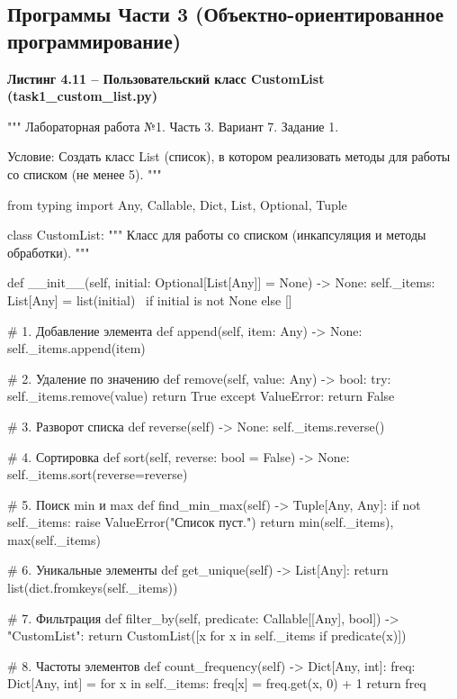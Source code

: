 \documentclass[14pt,a4paper]{extarticle}
\newcommand{\listingtitle}[1]{%
  \par\vspace{8pt}%
  \noindent\hspace*{1.25cm}\textbf{#1}\par\vspace{2pt}%
}
\begin{document}
\subsection{Программы Части 3 (Объектно-ориентированное программирование)}

\listingtitle{Листинг 4.11 -- Пользовательский класс CustomList (task1\_custom\_list.py)}
\begin{CodeListing}
"""
Лабораторная работа №1. Часть 3.
Вариант 7. Задание 1.

Условие:
Создать класс List (список), в котором реализовать методы для работы со
списком (не менее 5).
"""

from typing import Any, Callable, Dict, List, Optional, Tuple


class CustomList:
    """
    Класс для работы со списком (инкапсуляция и методы обработки).
    """

    def __init__(self, initial: Optional[List[Any]] = None) -> None:
        self._items: List[Any] = list(initial) \
            if initial is not None else []

    # 1. Добавление элемента
    def append(self, item: Any) -> None:
        self._items.append(item)

    # 2. Удаление по значению
    def remove(self, value: Any) -> bool:
        try:
            self._items.remove(value)
            return True
        except ValueError:
            return False

    # 3. Разворот списка
    def reverse(self) -> None:
        self._items.reverse()

    # 4. Сортировка
    def sort(self, reverse: bool = False) -> None:
        self._items.sort(reverse=reverse)

    # 5. Поиск min и max
    def find_min_max(self) -> Tuple[Any, Any]:
        if not self._items:
            raise ValueError("Список пуст.")
        return min(self._items), max(self._items)

    # 6. Уникальные элементы
    def get_unique(self) -> List[Any]:
        return list(dict.fromkeys(self._items))

    # 7. Фильтрация
    def filter_by(self, predicate: Callable[[Any], bool]) -> "CustomList":
        return CustomList([x for x in self._items if predicate(x)])

    # 8. Частоты элементов
    def count_frequency(self) -> Dict[Any, int]:
        freq: Dict[Any, int] = {}
        for x in self._items:
            freq[x] = freq.get(x, 0) + 1
        return freq


\end{CodeListing}
\end{document}
